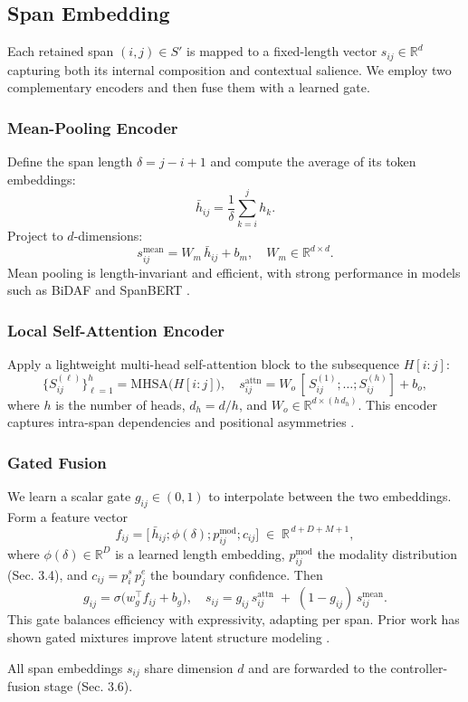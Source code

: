 \subsection{Span Embedding}

Each retained span \((i,j)\in S'\) is mapped to a fixed-length vector \(s_{ij}\in\mathbb{R}^d\) capturing both its internal composition and contextual salience. We employ two complementary encoders and then fuse them with a learned gate.

\subsubsection{Mean-Pooling Encoder}

Define the span length \(\delta=j-i+1\) and compute the average of its token embeddings:
\[
\bar h_{ij}
= \frac{1}{\delta} \sum_{k=i}^{j} h_k.
\]
Project to \(d\)-dimensions:
\[
s_{ij}^{\mathrm{mean}}
= W_m\,\bar h_{ij} + b_m,
\quad
W_m\in\mathbb{R}^{d\times d}.
\]
Mean pooling is length-invariant and efficient, with strong performance in models such as BiDAF and SpanBERT \cite{lee2017end,joshi2020spanbert}.

\subsubsection{Local Self-Attention Encoder}

Apply a lightweight multi-head self-attention block to the subsequence \(H[i{:}j]\):
\[
\{S_{ij}^{(\ell)}\}_{\ell=1}^h
= \mathrm{MHSA}\bigl(H[i{:}j]\bigr),
\quad
s_{ij}^{\mathrm{attn}}
= W_o\,[\,S_{ij}^{(1)};\dots;S_{ij}^{(h)}] + b_o,
\]
where \(h\) is the number of heads, \(d_h = d/h\), and \(W_o\in\mathbb{R}^{d\times(h\,d_h)}\).  This encoder captures intra-span dependencies and positional asymmetries \cite{lee2018higher,tay2021charformer}.

\subsubsection{Gated Fusion}

We learn a scalar gate \(g_{ij}\in(0,1)\) to interpolate between the two embeddings.  Form a feature vector
\[
f_{ij}
= \bigl[\,
\bar h_{ij};
\phi(\delta);
p^{\mathrm{mod}}_{ij};
c_{ij}
\bigr]
\;\in\;\mathbb{R}^{\,d + D + M + 1},
\]
where \(\phi(\delta)\in\mathbb{R}^D\) is a learned length embedding, \(p^{\mathrm{mod}}_{ij}\) the modality distribution (Sec. 3.4), and \(c_{ij}=p^s_i\,p^e_j\) the boundary confidence.  Then
\[
g_{ij}
= \sigma\bigl(w_g^{\!\top}f_{ij} + b_g\bigr),
\quad
s_{ij}
= g_{ij}\,s_{ij}^{\mathrm{attn}}
\;+\;(1-g_{ij})\,s_{ij}^{\mathrm{mean}}.
\]
This gate balances efficiency with expressivity, adapting per span.  Prior work has shown gated mixtures improve latent structure modeling \cite{drozdov2019unsupervised}.

All span embeddings \(s_{ij}\) share dimension \(d\) and are forwarded to the controller-fusion stage (Sec. 3.6).